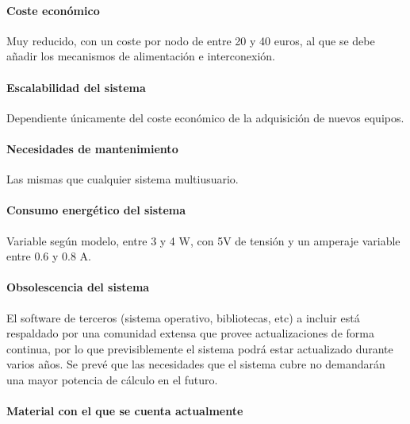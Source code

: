 \paragraph{Coste económico\\}

Muy reducido, con un coste por nodo de entre 20 y 40 euros, al que se debe añadir los mecanismos de alimentación e interconexión.

\paragraph{Escalabilidad del sistema\\}

Dependiente únicamente del coste económico de la adquisición de nuevos equipos.

\paragraph{Necesidades de mantenimiento\\}

Las mismas que cualquier sistema multiusuario.

\paragraph{Consumo energético del sistema\\}

Variable según modelo, entre 3 y 4 W, con 5V de tensión y un amperaje variable entre 0.6 y 0.8 A.

\paragraph{Obsolescencia del sistema\\}

El software de terceros (sistema operativo, bibliotecas, etc) a incluir está respaldado por una comunidad extensa que provee actualizaciones de forma continua, por lo que previsiblemente el sistema podrá estar actualizado durante varios años.
Se prevé que las necesidades que el sistema cubre no demandarán una mayor potencia de cálculo en el futuro.

\paragraph{Material con el que se cuenta actualmente\\}

